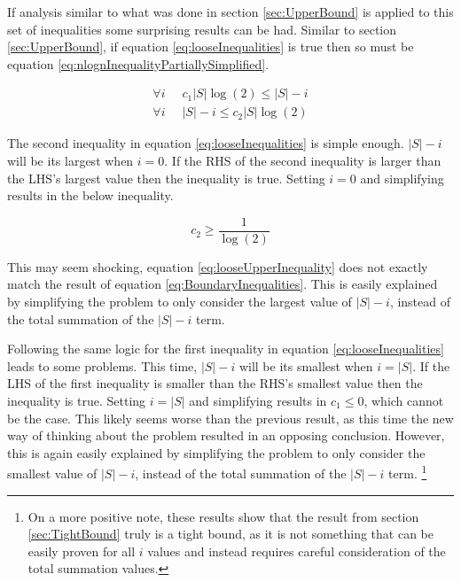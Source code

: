 \documentclass{article}
\begin{document}
If analysis similar to what was done in section \ref{sec:UpperBound} is applied to this set of inequalities some surprising results can be had. Similar to section \ref{sec:UpperBound}, if equation \ref{eq:looseInequalities} is true then so must be equation \ref{eq:nlognInequalityPartiallySimplified}.

\begin{equation}
	\begin{split}
		\forall i \;\; & c_1|S|\log(2)\le |S|-i \\
		\forall i \;\; & |S|-i\le c_2|S|\log(2)
	\end{split}
	\label{eq:looseInequalities}
\end{equation}

The second inequality in equation \ref{eq:looseInequalities} is simple enough. $|S|-i$ will be its largest when $i=0$. If the RHS of the second inequality is larger than the LHS's largest value then the inequality is true. Setting $i=0$ and simplifying results in the below inequality.

\begin{equation}
	c_2\ge \frac{1}{\log(2)}
	\label{eq:looseUpperInequality}
\end{equation}

This may seem shocking, equation \ref{eq:looseUpperInequality} does not exactly match the result of equation \ref{eq:BoundaryInequalities}. This is easily explained by simplifying the problem to only consider the largest value of $|S|-i$, instead of the total summation of the $|S|-i$ term.

Following the same logic for the first inequality in equation \ref{eq:looseInequalities} leads to some problems. This time, $|S|-i$ will be its smallest when $i=|S|$. If the LHS of the first inequality is smaller than the RHS's smallest value then the inequality is true. Setting $i=|S|$ and simplifying results in $c_1\le0$, which cannot be the case. This likely seems worse than the previous result, as this time the new way of thinking about the problem resulted in an opposing conclusion. However, this is again easily explained by simplifying the problem to only consider the smallest value of $|S|-i$, instead of the total summation of the $|S|-i$ term. \footnote{On a more positive note, these results show that the result from section \ref{sec:TightBound} truly is a tight bound, as it is not something that can be easily proven for all $i$ values and instead requires careful consideration of the total summation values.}
\end{document}
